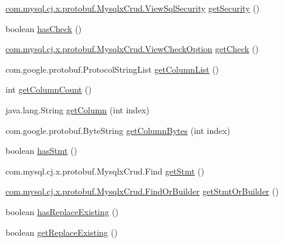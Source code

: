 \begin{DoxyCompactItemize}
\item 
\mbox{\hyperlink{enumcom_1_1mysql_1_1cj_1_1x_1_1protobuf_1_1_mysqlx_crud_1_1_view_sql_security}{com.\+mysql.\+cj.\+x.\+protobuf.\+Mysqlx\+Crud.\+View\+Sql\+Security}} \mbox{\hyperlink{interfacecom_1_1mysql_1_1cj_1_1x_1_1protobuf_1_1_mysqlx_crud_1_1_create_view_or_builder_ac84b1aa11c0a7d6f74d58147cde565f1}{get\+Security}} ()
\item 
boolean \mbox{\hyperlink{interfacecom_1_1mysql_1_1cj_1_1x_1_1protobuf_1_1_mysqlx_crud_1_1_create_view_or_builder_a095ce7982df4efc1f803feda4d0a8c98}{has\+Check}} ()
\item 
\mbox{\hyperlink{enumcom_1_1mysql_1_1cj_1_1x_1_1protobuf_1_1_mysqlx_crud_1_1_view_check_option}{com.\+mysql.\+cj.\+x.\+protobuf.\+Mysqlx\+Crud.\+View\+Check\+Option}} \mbox{\hyperlink{interfacecom_1_1mysql_1_1cj_1_1x_1_1protobuf_1_1_mysqlx_crud_1_1_create_view_or_builder_a63a2cbf6d56bb6d830f98f32eeb90914}{get\+Check}} ()
\item 
com.\+google.\+protobuf.\+Protocol\+String\+List \mbox{\hyperlink{interfacecom_1_1mysql_1_1cj_1_1x_1_1protobuf_1_1_mysqlx_crud_1_1_create_view_or_builder_adff8854628d5160168fd98625077fbe9}{get\+Column\+List}} ()
\item 
int \mbox{\hyperlink{interfacecom_1_1mysql_1_1cj_1_1x_1_1protobuf_1_1_mysqlx_crud_1_1_create_view_or_builder_ac388cc18a272c1d7c1442e030c930c8d}{get\+Column\+Count}} ()
\item 
java.\+lang.\+String \mbox{\hyperlink{interfacecom_1_1mysql_1_1cj_1_1x_1_1protobuf_1_1_mysqlx_crud_1_1_create_view_or_builder_a4de1d75f0350122876ce224da8cb07f0}{get\+Column}} (int index)
\item 
com.\+google.\+protobuf.\+Byte\+String \mbox{\hyperlink{interfacecom_1_1mysql_1_1cj_1_1x_1_1protobuf_1_1_mysqlx_crud_1_1_create_view_or_builder_abaa46ea013de0008fcccdd7757f874a7}{get\+Column\+Bytes}} (int index)
\item 
boolean \mbox{\hyperlink{interfacecom_1_1mysql_1_1cj_1_1x_1_1protobuf_1_1_mysqlx_crud_1_1_create_view_or_builder_a96be66daaa8dce121404fcde67cf8726}{has\+Stmt}} ()
\item 
com.\+mysql.\+cj.\+x.\+protobuf.\+Mysqlx\+Crud.\+Find \mbox{\hyperlink{interfacecom_1_1mysql_1_1cj_1_1x_1_1protobuf_1_1_mysqlx_crud_1_1_create_view_or_builder_ade4e83d41e9e30add60f37efaea0520e}{get\+Stmt}} ()
\item 
\mbox{\hyperlink{interfacecom_1_1mysql_1_1cj_1_1x_1_1protobuf_1_1_mysqlx_crud_1_1_find_or_builder}{com.\+mysql.\+cj.\+x.\+protobuf.\+Mysqlx\+Crud.\+Find\+Or\+Builder}} \mbox{\hyperlink{interfacecom_1_1mysql_1_1cj_1_1x_1_1protobuf_1_1_mysqlx_crud_1_1_create_view_or_builder_ab488baf1fc993adc3b679027a50af622}{get\+Stmt\+Or\+Builder}} ()
\item 
boolean \mbox{\hyperlink{interfacecom_1_1mysql_1_1cj_1_1x_1_1protobuf_1_1_mysqlx_crud_1_1_create_view_or_builder_a2f25e3b557237a8da04d7817f7e4383f}{has\+Replace\+Existing}} ()
\item 
boolean \mbox{\hyperlink{interfacecom_1_1mysql_1_1cj_1_1x_1_1protobuf_1_1_mysqlx_crud_1_1_create_view_or_builder_a5a9b4e22d098112f9dd9ecf83c1c48d4}{get\+Replace\+Existing}} ()
\end{DoxyCompactItemize}


